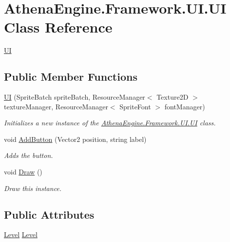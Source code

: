\hypertarget{class_athena_engine_1_1_framework_1_1_u_i_1_1_u_i}{\section{Athena\-Engine.\-Framework.\-U\-I.\-U\-I Class Reference}
\label{class_athena_engine_1_1_framework_1_1_u_i_1_1_u_i}
}


\hyperlink{class_athena_engine_1_1_framework_1_1_u_i_1_1_u_i}{U\-I}  


\subsection*{Public Member Functions}
\begin{DoxyCompactItemize}
\item 
\hyperlink{class_athena_engine_1_1_framework_1_1_u_i_1_1_u_i_a2e713d6137df9527efd4b5d7ce8e7101}{U\-I} (Sprite\-Batch sprite\-Batch, Resource\-Manager$<$ Texture2\-D $>$ texture\-Manager, Resource\-Manager$<$ Sprite\-Font $>$ font\-Manager)
\begin{DoxyCompactList}\small\item\em Initializes a new instance of the \hyperlink{class_athena_engine_1_1_framework_1_1_u_i_1_1_u_i}{Athena\-Engine.\-Framework.\-U\-I.\-U\-I} class. \end{DoxyCompactList}\item 
void \hyperlink{class_athena_engine_1_1_framework_1_1_u_i_1_1_u_i_a0f4362b863e50154777604ef19af747a}{Add\-Button} (Vector2 position, string label)
\begin{DoxyCompactList}\small\item\em Adds the button. \end{DoxyCompactList}\item 
void \hyperlink{class_athena_engine_1_1_framework_1_1_u_i_1_1_u_i_a709cd5fd90ea4f269150841d7f2cd43c}{Draw} ()
\begin{DoxyCompactList}\small\item\em Draw this instance. \end{DoxyCompactList}\end{DoxyCompactItemize}
\subsection*{Public Attributes}
\begin{DoxyCompactItemize}
\item 
\hyperlink{class_athena_engine_1_1_framework_1_1_gameplay_1_1_level}{Level} \hyperlink{class_athena_engine_1_1_framework_1_1_u_i_1_1_u_i_a674662599558fe8d717176488b8fe98b}{Level}
\end{DoxyCompactItemize}


